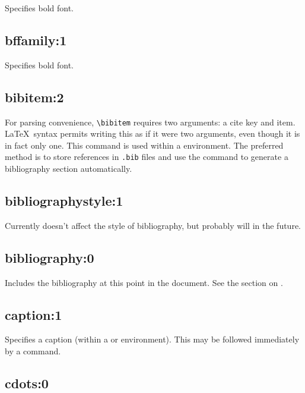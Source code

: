 Specifies bold font.

\subsection*{bffamily:1}\label{bffamily}

Specifies bold font.

\subsection*{bibitem:2}\label{bibitem}

For parsing convenience, \verb$\bibitem$ requires two arguments: a cite key and item.
\rtfsp\LaTeX\ syntax permits writing this as if it were two arguments,
even though it is in fact only one. This command is used within
a  environment. The preferred
method is to store references in {\tt .bib} files and use the \rtfsp
command to generate a bibliography section automatically.

\subsection*{bibliographystyle:1}\label{bibliographystyle}

Currently doesn't affect the style of bibliography, but probably will
in the future.

\subsection*{bibliography:0}\label{bibliographycmd}

Includes the bibliography at this point in the document. See the section
on .

\subsection*{caption:1}\label{caption}

Specifies a caption (within a  or  environment). This may
be followed immediately by a  command.

\subsection*{cdots:0}\label{cdots}


